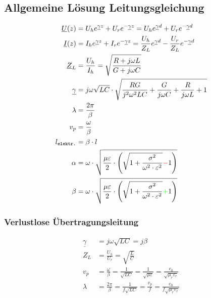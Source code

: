 \subsection{Allgemeine Lösung Leitungsgleichung}
\begin{align*}
    \underline{U}(z)   & = U_h e^{\underline{\gamma} z} + U_r e^{-\underline{\gamma} z} = U_h e^{\underline{\gamma} d} + U_r e^{-\underline{\gamma} d}                       \\
    \underline{I}(z)   & = I_h e^{\underline{\gamma} z} + I_r e^{-\underline{\gamma} z} = \frac{U_h}{Z_L}e^{\underline{\gamma} d} - \frac{U_r}{Z_L}e^{-\underline{\gamma} d} \\
    \underline{Z}_L    & = \frac{U_h}{I_h} = \sqrt{ \frac{R + j \omega L}{G + j \omega C}}                                                                                   \\
    \underline{\gamma} & = j \omega \sqrt{LC} \cdot \sqrt{ \frac{RG}{j^2 \omega^2 LC} + \frac{G}{j \omega C} + \frac{R}{j \omega L} + 1}                                     \\
    \lambda            & = \frac{2 \pi}{\beta}                                                                                                                               \\
    v_p                & = \frac{\omega}{\beta}                                                                                                                              \\
    l_\texttt{elektr.} & = \beta \cdot l                                                                                                                                     \\
    \alpha             & = \omega \cdot \sqrt{\dfrac{\mu \varepsilon}{2}\cdot \left(\sqrt{1+\dfrac{\sigma^2}{\omega^2\cdot\varepsilon^2}}{\color{red}{-}}1\right)}           \\
    \beta              & = \omega \cdot \sqrt{\dfrac{\mu \varepsilon}{2}\cdot \left(\sqrt{1+\dfrac{\sigma^2}{\omega^2\cdot\varepsilon^2}}{\color{green}{+}}1\right)}
\end{align*}

\subsubsection{Verlustlose Übertragungsleitung}
\begin{align*}
    \underline{\gamma} & = j\omega\sqrt{LC}= j\beta                                                                                           \\
    Z_L                & =\frac{U_h}{U_r}       = \sqrt{\frac{L}{C}}                                                                          \\
    v_p                & = \frac{\omega}{\beta} = \frac{1}{\sqrt{LC}}= \frac{1}{\sqrt{\mu\varepsilon}}= \frac{c_0}{\sqrt{\mu_r\varepsilon_r}} \\
    \lambda            & = \frac{2\pi}{\beta}=\frac{1}{f\sqrt{LC}}= \frac{v_p}{f}= \frac{c_0}{f\sqrt{\mu_r\varepsilon_r}}
\end{align*}

